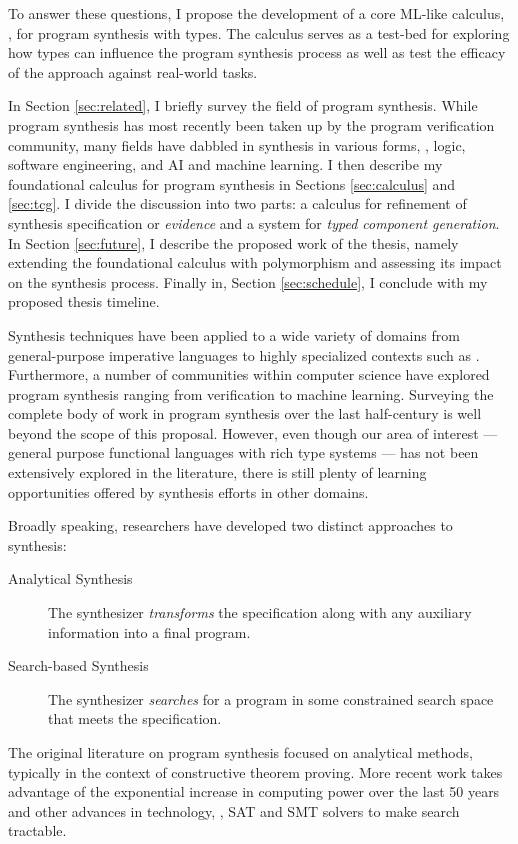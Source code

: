 To answer these questions, I propose the development of a core ML-like calculus,
\lsyn, for program synthesis with types.  The calculus serves as a test-bed for
exploring how types can influence the program synthesis process as well as test
the efficacy of the approach against real-world tasks.

In Section \ref{sec:related}, I briefly survey the field of program synthesis.
While program synthesis has most recently been taken up by the program
verification community, many fields have dabbled in synthesis in various forms,
\eg, logic, software engineering, and AI and machine learning. I then describe
my foundational calculus for program synthesis in Sections \ref{sec:calculus}
and \ref{sec:tcg}.  I divide the discussion into two parts: a calculus for
refinement of synthesis specification or \emph{evidence} and a system for
\emph{typed component generation}.  In Section \ref{sec:future}, I describe the
proposed work of the thesis, namely extending the foundational calculus with
polymorphism and assessing its impact on the synthesis process.  Finally in,
Section \ref{sec:schedule}, I conclude with my proposed thesis timeline.

Synthesis techniques have been applied to a wide variety of domains from
general-purpose imperative languages to highly specialized contexts such as
\cite{gupta-popl-2011, ghica-popl-2011, fisher-popl-2008}.  Furthermore, a
number of communities within computer science have explored program synthesis
ranging from verification to machine learning.  Surveying the complete body of
work in program synthesis over the last half-century is well beyond the scope of
this proposal.  However, even though our area of interest --- general purpose
functional languages with rich type systems --- has not been extensively
explored in the literature, there is still plenty of learning opportunities
offered by synthesis efforts in other domains.

Broadly speaking, researchers have developed two distinct approaches to
synthesis:
\begin{description}
\item[Analytical Synthesis] The synthesizer \emph{transforms} the specification
along with any auxiliary information into a final program.
\item[Search-based Synthesis] The synthesizer \emph{searches} for a program in
some constrained search space that meets the specification.
\end{description}
The original literature on program synthesis focused on analytical methods,
typically in the context of constructive theorem proving.  More recent work
takes advantage of the exponential increase in computing power over the last 50
years and other advances in technology, \eg, SAT and SMT solvers
\cite{barrett-smt-2008} to make search tractable.

